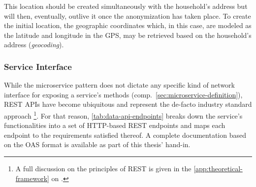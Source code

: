 This location should be created simultaneously with the household's address but will then, eventually, outlive it once the anonymization has taken place. To create the initial location, the geographic coordinates which, in this case, are modeled as the latitude and longitude in the \ac{GPS}, may be retrieved based on the household's address (\textit{geocoding}).


\subsubsection{Service Interface}
\label{sec:data-api-service-interface}

While the microservice pattern does not dictate any specific kind of network interface for exposing a service's methods (comp.~\autoref{sec:microservice-definition}), \acs{REST} \acsp{API} have become ubiquitous and represent the de-facto industry standard approach \footnote{A full discussion on the principles of \acs{REST} is given in the \autoref{app:theoretical-framework} on .}. For that reason, \autoref{tab:data-api-endpoints} breaks down the service's functionalities into a set of \acs{HTTP}-based \acs{REST} endpoints and maps each endpoint to the requirements satisfied thereof. A complete documentation based on the \ac{OAS} format is available as part of this thesis' hand-in.

